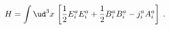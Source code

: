 \begin{equation}
H=\int \ud^3 x \, \left[ \frac{1}{2} E^a_i E^a_i
+ \frac{1}{2} B^a_i B^a_i - j^a_i A^a_i \right] \;.
\end{equation}

